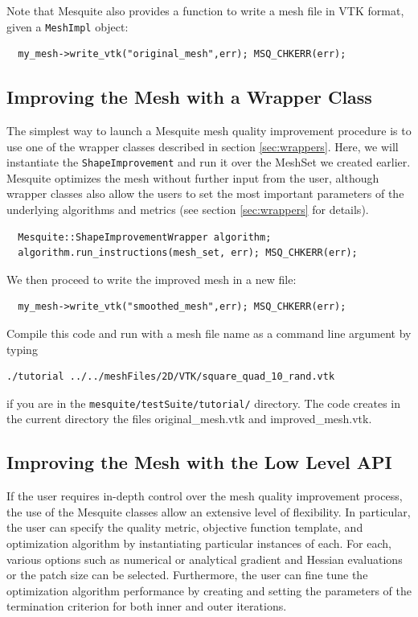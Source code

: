 \documentclass[letter]{report}
\begin{document}
Note that Mesquite also provides a function to write a mesh file in VTK format, given a \texttt{MeshImpl}
object: 
\begin{verbatim}
  my_mesh->write_vtk("original_mesh",err); MSQ_CHKERR(err);
\end{verbatim}


\subsection{Improving the Mesh with a Wrapper Class}
\label{sec:tutWrapper}
The simplest way to launch a Mesquite mesh quality improvement procedure is to use one of the
wrapper classes described in section \ref{sec:wrappers}. Here, we will instantiate the
\texttt{ShapeImprovement} and run it over the MeshSet we created earlier. Mesquite
optimizes the mesh without further input from the user, although wrapper classes also allow the
users to set the most important parameters of the underlying algorithms and metrics (see section
\ref{sec:wrappers} for details).
\begin{verbatim}
  Mesquite::ShapeImprovementWrapper algorithm;
  algorithm.run_instructions(mesh_set, err); MSQ_CHKERR(err);
\end{verbatim}
We then proceed to write the improved mesh in a new file:
\begin{verbatim}
  my_mesh->write_vtk("smoothed_mesh",err); MSQ_CHKERR(err);
\end{verbatim}
Compile this code and run with a mesh file name as a command line argument by 
typing 
\begin{verbatim}
./tutorial ../../meshFiles/2D/VTK/square_quad_10_rand.vtk
\end{verbatim}
if you are in the \texttt{mesquite/testSuite/tutorial/} directory.
The code creates in the current directory the files original\_mesh.vtk
and improved\_mesh.vtk. 

\subsection{Improving the Mesh with the Low Level API}
\label{sec:tutDetailedAPI}
If the user requires in-depth control over the mesh quality improvement
process, the use of the Mesquite classes allow an extensive
level of flexibility.   In particular, the user can specify the quality
metric, objective function template, and optimization algorithm by
instantiating particular instances of each.  For each, various options
such as numerical or analytical gradient and Hessian evaluations or
the patch size can be selected.  Furthermore, the user can fine tune
the optimization algorithm performance by creating and setting the parameters 
of the termination criterion for both inner and outer iterations.
\end{document}
